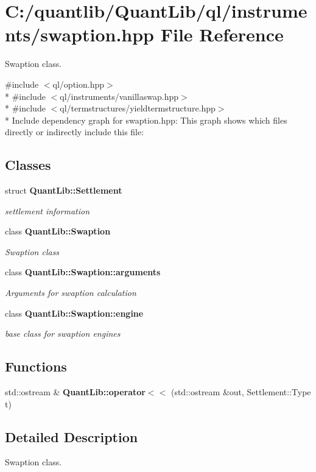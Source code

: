\section{C\+:/quantlib/\+Quant\+Lib/ql/instruments/swaption.hpp File Reference}
\label{swaption_8hpp}


Swaption class.  


{\ttfamily \#include $<$ql/option.\+hpp$>$}\\*
{\ttfamily \#include $<$ql/instruments/vanillaswap.\+hpp$>$}\\*
{\ttfamily \#include $<$ql/termstructures/yieldtermstructure.\+hpp$>$}\\*
Include dependency graph for swaption.\+hpp\+:
This graph shows which files directly or indirectly include this file\+:
\subsection*{Classes}
\begin{DoxyCompactItemize}
\item 
struct {\bf Quant\+Lib\+::\+Settlement}
\begin{DoxyCompactList}\small\item\em settlement information \end{DoxyCompactList}\item 
class {\bf Quant\+Lib\+::\+Swaption}
\begin{DoxyCompactList}\small\item\em Swaption class \end{DoxyCompactList}\item 
class {\bf Quant\+Lib\+::\+Swaption\+::arguments}
\begin{DoxyCompactList}\small\item\em Arguments for swaption calculation \end{DoxyCompactList}\item 
class {\bf Quant\+Lib\+::\+Swaption\+::engine}
\begin{DoxyCompactList}\small\item\em base class for swaption engines \end{DoxyCompactList}\end{DoxyCompactItemize}
\subsection*{Functions}
\begin{DoxyCompactItemize}
\item 
std\+::ostream \& {\bfseries Quant\+Lib\+::operator$<$$<$} (std\+::ostream \&out, Settlement\+::\+Type t)\label{swaption_8cpp_a4aad02d0d3917308efc7d58b28eba41b}

\end{DoxyCompactItemize}


\subsection{Detailed Description}
Swaption class. 

